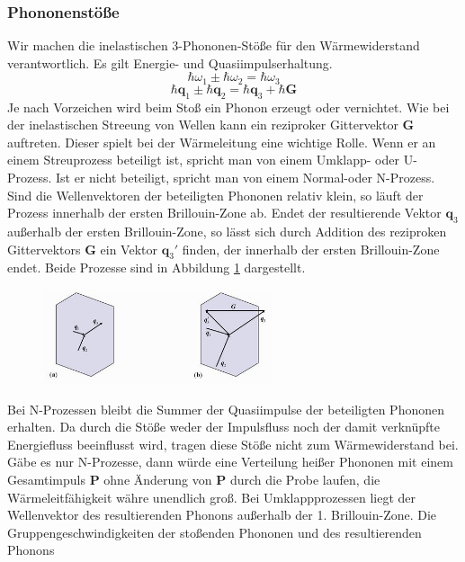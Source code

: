 \documentclass[11pt]{article}
\begin{document}
\subsubsection{Phononenstöße}
Wir machen die inelastischen 3-Phononen-Stöße für den Wärmewiderstand
verantwortlich. Es gilt Energie- und Quasiimpulserhaltung.
\begin{equation}
  \hbar\omega_1\pm\hbar\omega_2=\hbar\omega_3
\end{equation}
\begin{equation}
  \hbar\bm{q}_1\pm\hbar\bm{q}_2=\hbar\bm{q}_3+\hbar\bm{G}
\end{equation}
Je nach Vorzeichen wird beim Stoß ein Phonon erzeugt oder vernichtet. Wie bei
der inelastischen Streeung von Wellen kann ein reziproker Gittervektor $\bm{G}$
 auftreten. Dieser spielt bei der Wärmeleitung eine wichtige Rolle. Wenn er an
einem Streuprozess beteiligt ist, spricht man von einem Umklapp- oder U-Prozess.
Ist er nicht beteiligt, spricht man von einem Normal-oder N-Prozess.
Sind die Wellenvektoren der beteiligten Phononen relativ klein, so läuft der
Prozess innerhalb der ersten Brillouin-Zone ab. Endet der resultierende Vektor
$\bm{q}_3$ außerhalb der ersten Brillouin-Zone, so lässt sich durch Addition
des reziproken Gittervektors $\bm{G}$ ein Vektor $\bm{q}_3'$ finden, der
innerhalb der ersten Brillouin-Zone endet. Beide Prozesse sind in Abbildung
\ref{fig:umklapp} dargestellt.
\begin{figure}[h]
\includegraphics[width=0.6\textwidth]{umklapp}
\centering
\label{fig:umklapp}
\end{figure}
Bei N-Prozessen bleibt die Summer der Quasiimpulse der beteiligten Phononen
erhalten. Da durch die Stöße weder der Impulsfluss noch der damit verknüpfte
Energiefluss beeinflusst wird, tragen diese Stöße nicht zum Wärmewiderstand bei.
Gäbe es nur N-Prozesse, dann würde eine Verteilung heißer Phononen mit einem
Gesamtimpuls $\bm{P}$ ohne Änderung von $\bm{P}$ durch die Probe laufen, die
Wärmeleitfähigkeit währe unendlich groß. Bei Umklappprozessen liegt der
Wellenvektor des resultierenden Phonons außerhalb der 1. Brillouin-Zone. Die
Gruppengeschwindigkeiten der stoßenden Phononen und des resultierenden Phonons
\end{document}
